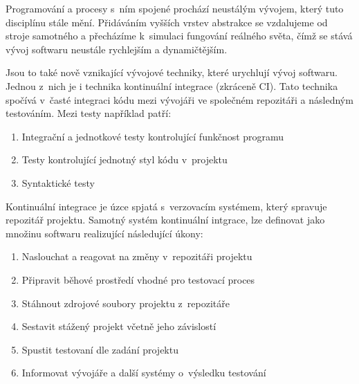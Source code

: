 \begin{introduction}

Programování a procesy s~ním spojené prochází neustálým vývojem, který tuto disciplínu stále mění. 
Přidáváním vyšších vrstev abstrakce se vzdalujeme od stroje samotného a přecházíme k~simulaci fungování reálného světa, čímž se stává vývoj softwaru neustále rychlejším a dynamičtějším. 


Jsou to také nově vznikající vývojové techniky, které urychlují vývoj softwaru.
Jednou z~nich je i technika kontinuální integrace (zkráceně CI).
Tato technika spočívá v~časté integraci kódu mezi vývojáři ve společném repozitáři a následným testováním. 
Mezi testy například patří:

\begin{enumerate}
	\item Integrační a jednotkové testy kontrolující funkčnost programu
	\item Testy kontrolující jednotný styl kódu v~projektu
	\item Syntaktické testy
\end{enumerate}

Kontinuální integrace je úzce spjatá s~verzovacím systémem, který spravuje repozitář projektu.
Samotný systém kontinuální intgrace, lze definovat jako množinu softwaru realizující následující úkony:

\begin{enumerate}
	\item Naslouchat a reagovat na změny v~repozitáři projektu
	\item Připravit běhové prostředí vhodné pro testovací proces
	\item Stáhnout zdrojové soubory projektu z~repozitáře
	\item Sestavit stážený projekt včetně jeho závislostí
	\item Spustit testovaní dle zadání projektu
	\item Informovat vývojáře a další systémy o~výsledku testování
\end{enumerate}

\end{introduction}
